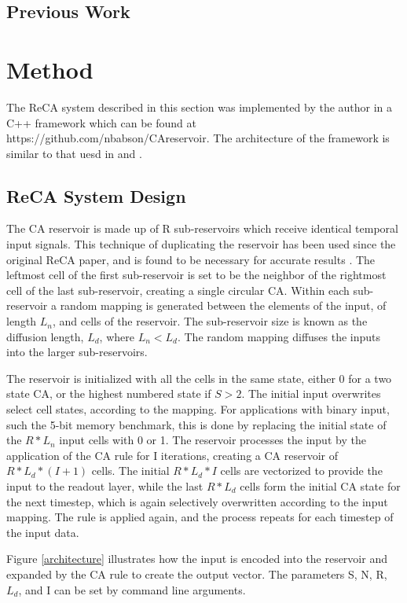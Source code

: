 \documentclass{facconf}
\begin{document}
\begin{multicols}{2}
\subsection{Previous Work}

\section{Method}\label{method}
The ReCA system described in this section was implemented by the author in a 
C++ framework which can be found at https://github.com/nbabson/CAreservoir. The 
architecture of the framework is similar to that uesd in  
\cite{nichele2017deep} and \cite{bye2016investigation}.

\subsection{ReCA System Design}
The CA reservoir is made up of R sub-reservoirs which receive identical 
temporal input signals. This technique of duplicating the reservoir has been 
used since the original ReCA paper, and is found to be necessary for accurate 
results \cite{yilmaz2014reservoir}.
The leftmost cell of the first sub-reservoir is set to be the 
neighbor of the rightmost cell of the last sub-reservoir, creating a single 
circular CA.  Within each sub-reservoir a random mapping is generated between 
the elements of the input, of length $L_{n}$, and cells of the reservoir. The 
sub-reservoir size is known as the diffusion length, $L_{d}$, where $L_{n} < 
L_{d}$. The random mapping diffuses the inputs into the larger sub-reservoirs.  
\par The reservoir is initialized with all the cells in the same state, either 
0 for a two state CA, or the highest numbered state if $S > 2$. The initial 
input overwrites select cell states, according to the mapping. For applications 
with binary input, such the 5-bit memory benchmark, this is done by replacing 
the initial state of the $R * L_{n}$ input cells with 0 or 1.  The reservoir 
processes the input by the application of the CA rule for I iterations, 
          creating a CA reservoir of $R * L_{d} * (I + 1)$ cells. The initial 
          $R * L_{d} * I$ cells are vectorized to provide the input to the 
          readout layer, while the last $R * L_{d}$ cells form the initial CA 
          state for the next timestep, which is again selectively overwritten 
          according to the input mapping. The rule is applied again, and the 
          process repeats for each timestep of the input data.  \par  Figure 
          \ref{architecture} illustrates how the input is encoded into the 
          reservoir and expanded by the CA rule to create the output vector.  
          The parameters S, N, R, $L_{d}$, and I can be set by command line 
          arguments.


\end{multicols}
\end{document}
